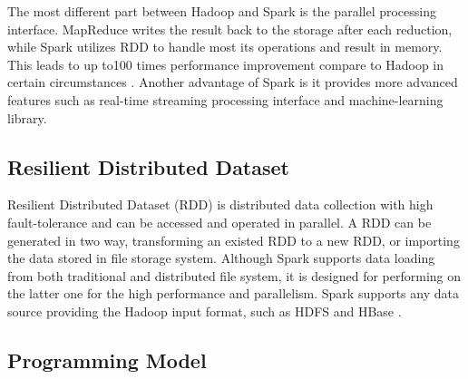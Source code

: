 The most different part between Hadoop and Spark is the parallel processing interface. MapReduce writes the result back to the storage after each reduction, while Spark utilizes RDD to handle most its operations and result in memory. This leads to up to100 times performance improvement compare to Hadoop in certain circumstances \cite{ApacheSpark}. Another advantage of Spark is it provides more advanced features such as real-time streaming processing interface and machine-learning library.

\subsection{Resilient Distributed Dataset}

Resilient Distributed Dataset (RDD) is distributed data collection with high fault-tolerance and can be accessed and operated in parallel. A RDD can be generated in two way, transforming an existed RDD to a new RDD, or importing the data stored in file storage system. Although Spark supports data loading from both traditional and distributed file system, it is designed for performing on the latter one for the high performance and parallelism. Spark supports any data source providing the Hadoop input format, such as HDFS and HBase \cite{ApacheSpark}.



\subsection{Programming Model}







